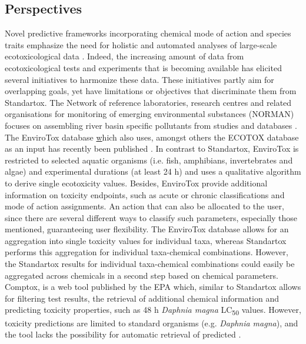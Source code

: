 \subsection{Perspectives}
Novel predictive frameworks incorporating chemical mode of action and species traits emphasize the need for holistic and automated analyses of large-scale ecotoxicological data \citep{malaj_evolutionary_2016, vandenberg_modeling_2019}. Indeed, the increasing amount of data from ecotoxicological tests and experiments that is becoming available has elicited several initiatives to  harmonize these data. These initiatives partly aim for overlapping goals, yet have limitations or objectives that discriminate them from Standartox. The Network of reference laboratories, research centres and related organisations for monitoring of emerging environmental substances (NORMAN) focuses on assembling river basin specific pollutants from studies and databases \citep{von_der_ohe_new_2011}. The EnviroTox database \href{https://envirotoxdatabase.org/} which also uses, amongst others the ECOTOX database as an input has recently been published \citep{healthandenvironmentalsciencesinstitutehesi_envirotox_2019, connors_creation_2019}. In contrast to Standartox, EnviroTox  is restricted to selected aquatic organisms (i.e. fish, amphibians, invertebrates and algae) and experimental durations (at least 24 h) and uses a qualitative algorithm to derive single ecotoxicity values. Besides, EnviroTox provide additional information on toxicity endpoints, such as acute or chronic classifications and mode of action assignments. An action that can also be allocated to the user, since there are several different ways to classify such parameters, especially those mentioned, guaranteeing user flexibility. The EnviroTox database allows for an aggregation into single toxicity values for individual taxa,  whereas Standartox performs this aggregation for individual taxa-chemical combinations. However, the Standartox results for individual taxa-chemical combinations could easily be aggregated across chemicals in a second step based on chemical parameters. Comptox, is a web tool published by the EPA which, similar to Standartox allows for filtering test results, the retrieval of additional chemical information and predicting toxicity properties, such as 48 h \textit{Daphnia magna} LC\textsubscript{50} values. However, toxicity predictions are limited to standard organisms (e.g. \textit{Daphnia magna}), and the tool lacks the possibility for automatic retrieval of predicted \citep{williams_comptox_2017}. 


